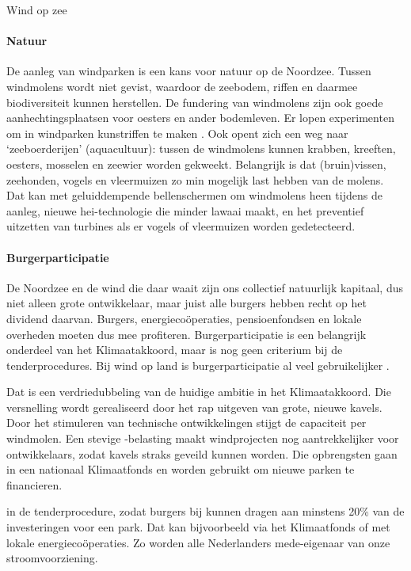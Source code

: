 \begin{voorstel}{Wind op zee}
\begin{multicols}{2}
\begin{overwegingen}
\paragraph{Natuur}
De aanleg van windparken is een kans voor natuur op de Noordzee. Tussen windmolens wordt niet gevist, waardoor de zeebodem, riffen en daarmee biodiversiteit kunnen herstellen.  De fundering van windmolens zijn ook goede aanhechtingsplaatsen voor oesters en ander bodemleven. Er lopen experimenten om in windparken kunstriffen te maken \parencite{didderen_offshore_2019}. Ook opent zich een weg naar ‘zeeboerderijen’ (aquacultuur): tussen de windmolens kunnen krabben, kreeften, oesters, mosselen en zeewier worden gekweekt.
Belangrijk is dat (bruin)vissen, zeehonden, vogels en vleermuizen zo min mogelijk last hebben van de molens. Dat kan met geluiddempende bellenschermen om windmolens heen tijdens de aanleg, nieuwe hei-technologie die minder lawaai maakt, en het preventief uitzetten van turbines als er vogels of vleermuizen worden gedetecteerd.

\paragraph{Burgerparticipatie}
De Noordzee en de wind die daar waait zijn ons collectief natuurlijk kapitaal, dus niet alleen grote ontwikkelaar, maar juist alle burgers hebben recht op het dividend daarvan. Burgers, energiecoöperaties, pensioenfondsen en lokale overheden moeten dus mee profiteren. Burgerparticipatie is een belangrijk onderdeel van het Klimaatakkoord, maar is nog geen criterium bij de tenderprocedures. Bij wind op land is burgerparticipatie al veel gebruikelijker \parencite{nwea_gedragscode_2016}.

\end{overwegingen}

\begin{aanbevelingen}

Dat is een verdriedubbeling van de huidige ambitie in het Klimaatakkoord. Die versnelling wordt gerealiseerd door het rap uitgeven van grote, nieuwe kavels. Door het stimuleren van technische ontwikkelingen stijgt de capaciteit per windmolen. Een stevige \COO-belasting maakt windprojecten nog aantrekkelijker voor ontwikkelaars, zodat kavels straks geveild kunnen worden. Die opbrengsten gaan in een nationaal Klimaatfonds en worden gebruikt om nieuwe parken te financieren.

 in de tenderprocedure, zodat burgers bij kunnen dragen aan minstens 20\% van de investeringen voor een park.
Dat kan bijvoorbeeld via het Klimaatfonds of met lokale energiecoöperaties. Zo worden alle Nederlanders mede-eigenaar van onze stroomvoorziening.


\end{aanbevelingen}
\end{multicols}
\end{voorstel}
